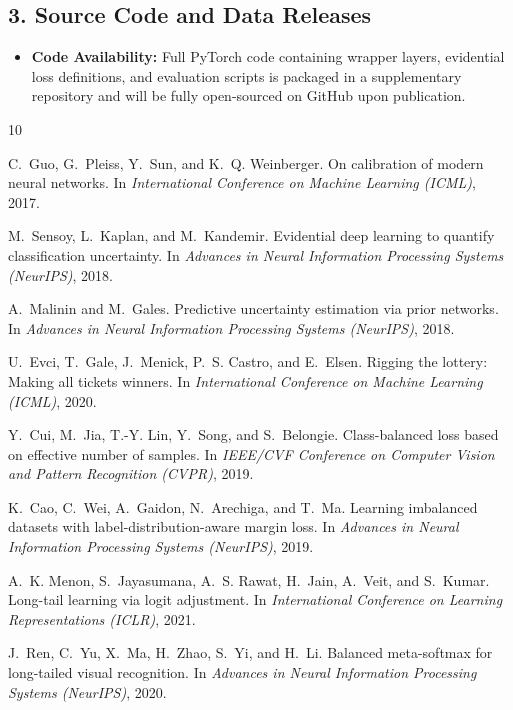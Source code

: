 \documentclass[letterpaper]{article} %
\begin{document}
\subsection*{3. Source Code and Data Releases}
\begin{itemize}
    \item \textbf{Code Availability:} Full PyTorch code containing wrapper layers, evidential loss definitions, and evaluation scripts is packaged in a supplementary repository and will be fully open-sourced on GitHub upon publication.
\end{itemize}
\begin{thebibliography}{10}\itemsep=-1pt

C.~Guo, G.~Pleiss, Y.~Sun, and K.~Q. Weinberger.
\newblock On calibration of modern neural networks.
\newblock In {\em International Conference on Machine Learning (ICML)}, 2017.

M.~Sensoy, L.~Kaplan, and M.~Kandemir.
\newblock Evidential deep learning to quantify classification uncertainty.
\newblock In {\em Advances in Neural Information Processing Systems (NeurIPS)}, 2018.

A.~Malinin and M.~Gales.
\newblock Predictive uncertainty estimation via prior networks.
\newblock In {\em Advances in Neural Information Processing Systems (NeurIPS)}, 2018.

U.~Evci, T.~Gale, J.~Menick, P.~S. Castro, and E.~Elsen.
\newblock Rigging the lottery: Making all tickets winners.
\newblock In {\em International Conference on Machine Learning (ICML)}, 2020.

Y.~Cui, M.~Jia, T.-Y. Lin, Y.~Song, and S.~Belongie.
\newblock Class-balanced loss based on effective number of samples.
\newblock In {\em IEEE/CVF Conference on Computer Vision and Pattern Recognition (CVPR)}, 2019.

K.~Cao, C.~Wei, A.~Gaidon, N.~Arechiga, and T.~Ma.
\newblock Learning imbalanced datasets with label-distribution-aware margin loss.
\newblock In {\em Advances in Neural Information Processing Systems (NeurIPS)}, 2019.

A.~K. Menon, S.~Jayasumana, A.~S. Rawat, H.~Jain, A.~Veit, and S.~Kumar.
\newblock Long-tail learning via logit adjustment.
\newblock In {\em International Conference on Learning Representations (ICLR)}, 2021.

J.~Ren, C.~Yu, X.~Ma, H.~Zhao, S.~Yi, and H.~Li.
\newblock Balanced meta-softmax for long-tailed visual recognition.
\newblock In {\em Advances in Neural Information Processing Systems (NeurIPS)}, 2020.


\end{thebibliography}
\end{document}
